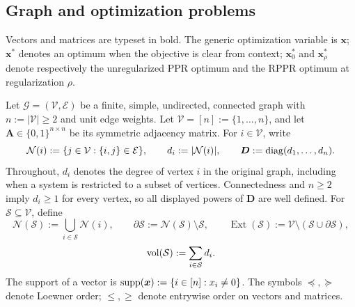 %

\subsection{Graph and optimization problems}
\label{subsec:shared-source-aligned-problem}

Vectors and matrices are typeset in bold. The generic optimization
variable is \(\bm{x}\); \(\bm{x}^*\) denotes an optimum when the objective is
clear from context; \(\bm{x}_0^*\) and \(\bm{x}_\rho^*\) denote respectively
the unregularized PPR optimum and the RPPR optimum at regularization
\(\rho\).

Let \(\mathcal{G}=(\mathcal{V},\mathcal{E})\) be a finite, simple,
undirected, connected graph with \(n:=|\mathcal{V}|\geq2\) and unit edge
weights. Let \(\mathcal{V}=[n]:=\{1,\ldots,n\}\), and let
\(\bm{A}\in\{0,1\}^{n\times n}\) be its symmetric adjacency matrix. For
\(i\in\mathcal{V}\), write
\[
    \mathcal N(i):=\{j\in\mathcal{V}:\{i,j\}\in\mathcal{E}\},
    \qquad
    d_i:=|\mathcal N(i)|,
    \qquad
    \bm{D}:=\operatorname{diag}(d_1,\ldots,d_n).
\]
Throughout, \(d_i\) denotes the degree of vertex \(i\) in the original graph,
including when a system is restricted to a subset of vertices.
Connectedness and \(n\geq2\) imply \(d_i\geq1\) for every vertex, so all
displayed powers of \(\bm{D}\) are well defined.
For \(\mathcal{S}\subseteq\mathcal{V}\), define
\[
    \mathcal N(\mathcal{S}):=\bigcup_{i\in\mathcal{S}}\mathcal N(i),
    \qquad
    \partial\mathcal{S}:=\mathcal N(\mathcal{S})\setminus\mathcal{S},
    \qquad
    \operatorname{Ext}(\mathcal{S}):=\mathcal{V}\setminus(\mathcal{S}\cup\partial\mathcal{S}),
\]
\begin{equation}
    \operatorname{vol}(\mathcal{S}):=\sum_{i\in\mathcal{S}}d_i.
    \label{eq:shared-volume}
\end{equation}
The support of a vector is
\(\operatorname{supp}(\bm{x}):=\{i\in[n]:x_i\neq0\}\). The symbols \(\preceq,\succeq\)
denote Loewner order; \(\leq,\geq\) denote entrywise order on vectors and
matrices.

